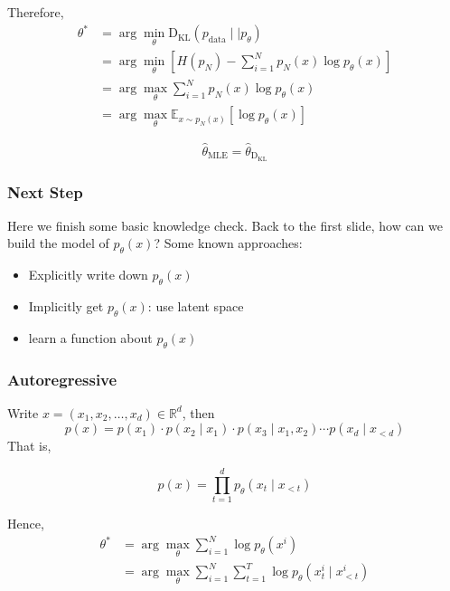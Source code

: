 \documentclass{beamer}
\begin{document}
\begin{frame}[t]
Therefore,
\begin{align*}
    \theta^*&=\arg\min_\theta\mathrm{D_{KL}}(p_{\text{data}}\mid\mid p_\theta)\\
    &=\arg\min_\theta \left[H(p_N)-\sum_{i=1}^N p_N(x)\log p_\theta(x)\right]\\
    &=\arg\max_\theta \sum_{i=1}^Np_N(x)\log p_\theta(x)\\
    &=\arg\max_\theta \mathbb{E}_{x\sim p_N(x)}[\log p_\theta(x)]
\end{align*}
\vspace{2em}
\begin{tcolorbox}[colback=blue!1!white,
                  colframe=blue!75!black]
$$
\hat\theta_\text{MLE}=\hat\theta_{\mathrm{D_{KL}}}
$$
\end{tcolorbox}
\end{frame}

\begin{frame}[t]
\frametitle{Next Step}
Here we finish some basic knowledge check. Back to the first slide, how can we build the model of $p_\theta(x)$?
Some known approaches:
\begin{itemize}
    \item Explicitly write down $p_\theta(x)$
    \item Implicitly get $p_\theta(x)$: use latent space
    \item learn a function about $p_\theta(x)$
\end{itemize}
\end{frame}

\begin{frame}[t]
\frametitle{Autoregressive}
Write $x=(x_1,x_2,\dots,x_d)\in\mathbb{R}^d$, then
$$
p(x)=p(x_1)\cdot p(x_2\mid x_1)\cdot p(x_3\mid x_1, x_2)\cdots p(x_d\mid x_{<d})
$$
That is,
\begin{tcolorbox}[colback=blue!1!white,
                  colframe=blue!75!black]
$$
p(x)=\prod_{t=1}^d p_\theta(x_t\mid x_{<t})
$$
\end{tcolorbox}
Hence,
\begin{align*}
    \theta^*&=\arg\max_\theta\sum_{i=1}^N\log p_\theta(x^i)\\
    &=\arg\max_\theta\sum_{i=1}^N\sum_{t=1}^T\log p_\theta(x_t^i\mid x_{<t}^i)
\end{align*}
\end{frame}
\end{document}
